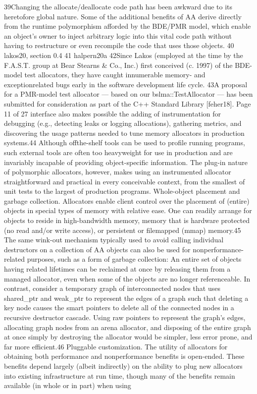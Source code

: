 39Changing the allocate/deallocate code path has been awkward due to its heretofore global nature.
Some of the additional benefits of AA derive directly from the runtime polymorphism afforded by the
BDE/PMR model, which enable an object’s owner to inject arbitrary logic into this vital code path
without having to restructure or even recompile the code that uses those objects.
40 lakos20, section 0.4 41 halpern20a
42Since Lakos (employed at the time by the F.A.S.T. group at Bear Stearns & Co., Inc.) first conceived
(c. 1997) of the BDE-model test allocators, they have caught innumerable memory- and exceptionrelated bugs early in the software development life cycle. 43A proposal for a PMR-model test allocator — based on our bslma::TestAllocator — has been
submitted for consideration as part of the C++ Standard Library [feher18].
Page 11 of 27
interface also makes possible the adding of instrumentation for debugging (e.g.,
detecting leaks or logging allocations), gathering metrics, and discovering the usage
patterns needed to tune memory allocators in production systems.44 Although offthe-shelf tools can be used to profile running programs, such external tools are
often too heavyweight for use in production and are invariably incapable of providing
object-specific information. The plug-in nature of polymorphic allocators, however,
makes using an instrumented allocator straightforward and practical in every
conceivable context, from the smallest of unit tests to the largest of production
programs.
Whole-object placement and garbage collection. Allocators enable client control
over the placement of (entire) objects in special types of memory with relative ease.
One can readily arrange for objects to reside in high-bandwidth memory, memory
that is hardware protected (no read and/or write access), or persistent or filemapped (mmap) memory.45 The same wink-out mechanism typically used to avoid
calling individual destructors on a collection of AA objects can also be used for nonperformance-related purposes, such as a form of garbage collection: An entire set of
objects having related lifetimes can be reclaimed at once by releasing them from a
managed allocator, even when some of the objects are no longer referenceable. In
contrast, consider a temporary graph of interconnected nodes that uses shared_ptr
and weak_ptr to represent the edges of a graph such that deleting a key node
causes the smart pointers to delete all of the connected nodes in a recursive
destructor cascade. Using raw pointers to represent the graph’s edges, allocating
graph nodes from an arena allocator, and disposing of the entire graph at once
simply by destroying the allocator would be simpler, less error prone, and far more
efficient.46
Pluggable customization. The utility of allocators for obtaining both performance
and nonperformance benefits is open-ended. These benefits depend largely (albeit
indirectly) on the ability to plug new allocators into existing infrastructure at run
time, though many of the benefits remain available (in whole or in part) when using

